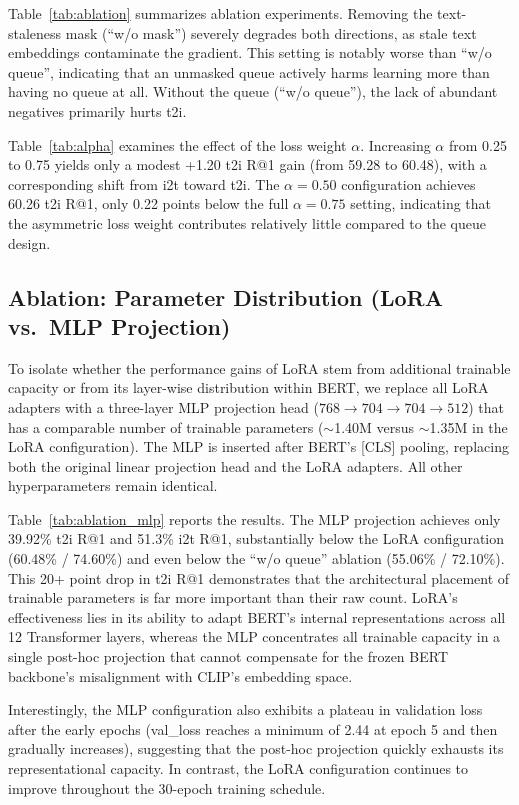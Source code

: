 \documentclass[10pt,leqno]{amsart}
\begin{document}
Table~\ref{tab:ablation} summarizes ablation experiments. Removing the text-staleness mask (``w/o mask'') severely degrades both directions, as stale text embeddings contaminate the gradient. This setting is notably worse than ``w/o queue'', indicating that an unmasked queue actively harms learning more than having no queue at all. Without the queue (``w/o queue''), the lack of abundant negatives primarily hurts t2i.

Table~\ref{tab:alpha} examines the effect of the loss weight $\alpha$. Increasing $\alpha$ from 0.25 to 0.75 yields only a modest +1.20 t2i R@1 gain (from 59.28 to 60.48), with a corresponding shift from i2t toward t2i. The $\alpha{=}0.50$ configuration achieves 60.26 t2i R@1, only 0.22 points below the full $\alpha{=}0.75$ setting, indicating that the asymmetric loss weight contributes relatively little compared to the queue design.

\subsection{Ablation: Parameter Distribution (LoRA vs.\ MLP Projection)}

To isolate whether the performance gains of LoRA stem from additional trainable capacity or from its layer-wise distribution within BERT, we replace all LoRA adapters with a three-layer MLP projection head ($768 \to 704 \to 704 \to 512$) that has a comparable number of trainable parameters (${\sim}$1.40M versus ${\sim}$1.35M in the LoRA configuration). The MLP is inserted after BERT's [CLS] pooling, replacing both the original linear projection head and the LoRA adapters. All other hyperparameters remain identical.

Table~\ref{tab:ablation_mlp} reports the results. The MLP projection achieves only 39.92\% t2i R@1 and 51.3\% i2t R@1, substantially below the LoRA configuration (60.48\% / 74.60\%) and even below the ``w/o queue'' ablation (55.06\% / 72.10\%). This 20+ point drop in t2i R@1 demonstrates that the architectural placement of trainable parameters is far more important than their raw count. LoRA's effectiveness lies in its ability to adapt BERT's internal representations across all 12 Transformer layers, whereas the MLP concentrates all trainable capacity in a single post-hoc projection that cannot compensate for the frozen BERT backbone's misalignment with CLIP's embedding space.

Interestingly, the MLP configuration also exhibits a plateau in validation loss after the early epochs (val\_loss reaches a minimum of 2.44 at epoch 5 and then gradually increases), suggesting that the post-hoc projection quickly exhausts its representational capacity. In contrast, the LoRA configuration continues to improve throughout the 30-epoch training schedule.
\end{document}
